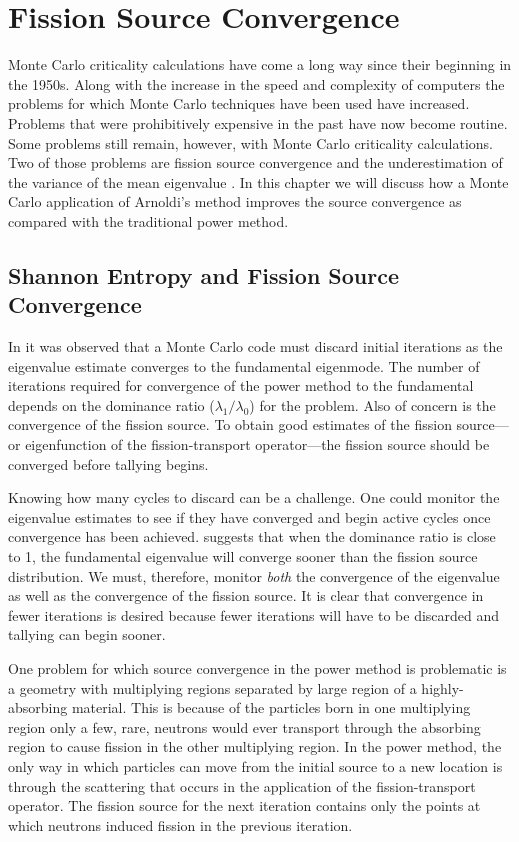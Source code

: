 \chapter{Fission Source Convergence \label{ch:AdvancedArnoldi}}
Monte Carlo criticality calculations have come a long way since their beginning in the 1950s.  Along with the increase in the speed and complexity of computers the problems for which Monte Carlo techniques have been used have increased.  Problems that were prohibitively expensive in the past have now become routine.  Some problems still remain, however,  with Monte Carlo criticality calculations.  Two of those problems are fission source convergence and the underestimation of the variance of the mean eigenvalue \citep[see][]{Brown:2009A-Rev-0}.  In this chapter we will discuss how a Monte Carlo application of Arnoldi's method improves the source convergence as compared with the traditional power method.

\section{Shannon Entropy and Fission Source Convergence \label{sec:Entropy} }
In  it was observed that a Monte Carlo code must discard initial iterations as the eigenvalue estimate converges to the fundamental eigenmode.  The number of iterations required for convergence of the power method to the fundamental depends on the dominance ratio ($\lambda_1/\lambda_0$) for the problem.  Also of concern is the convergence of the fission source.  To obtain good estimates of the fission source---or eigenfunction of the fission-transport operator---the fission source should be converged before tallying begins.

Knowing how many cycles to discard can be a challenge.  One could monitor the eigenvalue estimates to see if they have converged and begin active cycles once convergence has been achieved.  \citet{Brown:2009A-Rev-0} suggests that when the dominance ratio is close to 1, the fundamental eigenvalue will converge sooner than the fission source distribution.  We must, therefore, monitor \emph{both} the convergence of the eigenvalue as well as the convergence of the fission source.  It is clear that convergence in fewer iterations is desired because fewer iterations will have to be discarded and tallying can begin sooner.  

One problem for which source convergence in the power method is problematic is a geometry with multiplying regions separated by large region of a highly-absorbing material.  This is because of the particles born in one multiplying region only a few, rare, neutrons would ever transport through the absorbing region to cause fission in the other multiplying region.  In the power method, the only way in which particles can move from the initial source to a new location is through the scattering that occurs in the application of the fission-transport operator.  The fission source for the next iteration contains only the points at which neutrons induced fission in the previous iteration.

